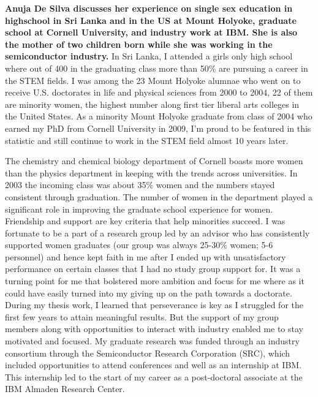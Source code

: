 \documentclass[utf8]{frontiersSCNS} %
\begin{document}
{\bf 
Anuja De Silva discusses her experience on single sex education in highschool in Sri Lanka and in the US at Mount Holyoke, graduate school at Cornell University, and industry work at IBM. She is also the mother of two children born while she was working in the semiconductor industry.}
In Sri Lanka, I attended a girls only high school where out of 400 in the graduating class more than 50\% are pursuing a career in the STEM fields.  I was among the 23  Mount Holyoke alumnae who went on to receive U.S. doctorates in life and physical sciences from 2000 to 2004, 22 of them are minority women, the highest number along first tier liberal arts colleges in the United States. As a minority Mount Holyoke graduate from class of 2004 who earned my PhD from Cornell University in 2009, I’m proud to be featured in this statistic and still continue to work in the STEM field almost 10 years later.

The chemistry and chemical biology department of Cornell boasts more women than the physics department in keeping with the trends across universities. In 2003 the incoming class was about 35\% women and the numbers stayed consistent through graduation. The number of women in the department played a significant role in improving the graduate school experience for women. Friendship and support are key criteria that help  minorities succeed. I was fortunate to be a part of a research group led by an advisor who has consistently supported women graduates (our group was always 25-30\% women; 5-6 personnel) and hence kept faith in me after I ended up with unsatisfactory performance on certain classes that I had no study group support for. It was a turning point for me that bolstered more ambition and focus for me where as it could have easily turned into my giving up on the path towards a doctorate. During my thesis work, I learned that perseverance is key as I struggled for the first few years to attain meaningful results. But the support of my group members along with opportunities to interact with industry enabled me to stay motivated and focused. My graduate research was funded through an industry consortium through the Semiconductor Research Corporation (SRC), which included opportunities to attend conferences and well as an internship at IBM. This internship led to the start of my career as a post-doctoral associate at the IBM Almaden Research Center.
\end{document}
